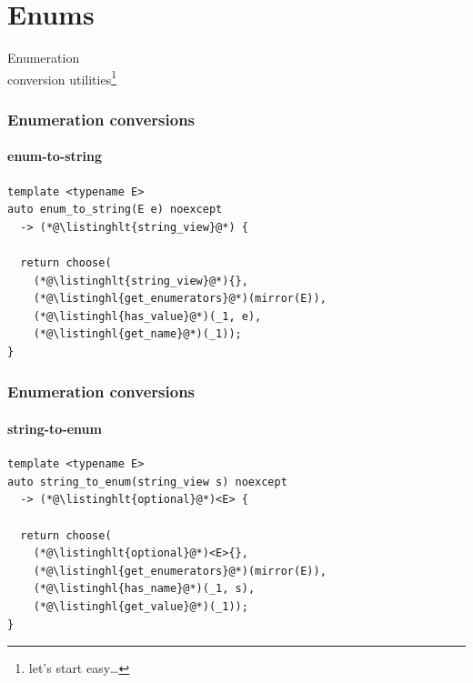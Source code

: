 \documentclass[compress,table,xcolor=table]{beamer}
\begin{document}
\section{Enums}
\begin{frame}[c]
  \Huge
  \centering
  Enumeration\\
  \large
  conversion utilities\footnote{let's start easy\ldots}
\end{frame}
\begin{frame}[fragile]
  \frametitle{Enumeration conversions}
  \framesubtitle{enum-to-string}
  \begin{lstlisting}[language=c++2x]
template <typename E>
auto enum_to_string(E e) noexcept
  -> (*@\listinghlt{string_view}@*) {

  return choose(
    (*@\listinghlt{string_view}@*){},
    (*@\listinghl{get_enumerators}@*)(mirror(E)),
    (*@\listinghl{has_value}@*)(_1, e),
    (*@\listinghl{get_name}@*)(_1));
}
  \end{lstlisting}
\end{frame}
\begin{frame}[fragile]
  \frametitle{Enumeration conversions}
  \framesubtitle{string-to-enum}
  \begin{lstlisting}[language=c++2x]
template <typename E>
auto string_to_enum(string_view s) noexcept
  -> (*@\listinghlt{optional}@*)<E> {

  return choose(
    (*@\listinghlt{optional}@*)<E>{},
    (*@\listinghl{get_enumerators}@*)(mirror(E)),
    (*@\listinghl{has_name}@*)(_1, s),
    (*@\listinghl{get_value}@*)(_1));
}
  \end{lstlisting}
\end{frame}
\end{document}
